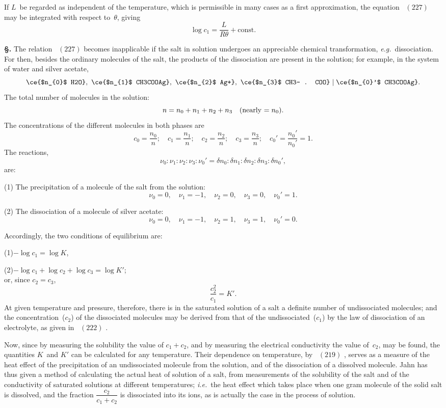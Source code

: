 \documentclass[12pt]{book}[2005/09/16]
\newcommand{\Chg}[2]{#2}
\newcommand{\Add}[1]{\Chg{}{#1}}
\newcommand{\Section}[1]{
  \medskip\par\textbf{§\;#1}
  \label{section:#1}
}
\newcommand{\Eq}[1]{%
  \hyperref[eqn:#1]{\ensuremath{#1}}%
}
\newcommand{\PageSep}[1]{\ignorespaces}
\newcommand{\const}{\text{const.}}
\newcommand{\eg}{\emph{e.g.}}
\newcommand{\ie}{\emph{i.e.}}
\begin{document}
If $L$~be regarded as independent of the temperature,
which is permissible in many cases as a first approximation,
the equation~\Eq{(227)} may be integrated with respect to~$\theta$,
giving
\[
\log c_{1} = \frac{L}{R\theta} + \const
\]

\Section{267.} The relation~\Eq{(227)} becomes inapplicable if the
salt in solution undergoes an appreciable chemical transformation,
\eg\ dissociation. For then, besides the ordinary
\PageSep{244}
molecules of the salt, the products of the dissociation are
present in the solution; for example, in the system of
water and silver acetate,
%
%
%
\[
\ce{$n_{0}$ H2O},\
\ce{$n_{1}$ CH3COOAg},\
\ce{$n_{2}$ Ag+},\
\ce{$n_{3}$ CH3- . COO} \mid
\ce{$n_{0}'$ CH3COOAg}.
\]
The total number of molecules in the solution:
\[
n = n_{0} + n_{1} + n_{2} + n_{3}\quad\text{(nearly $ = n_{0}$).}
\]
The concentrations of the different molecules in both phases
are
\[
c_{0} = \frac{n_{0}}{n};\quad
c_{1} = \frac{n_{1}}{n};\quad
c_{2} = \frac{n_{2}}{n};\quad
c_{3} = \frac{n_{3}}{n};\quad
c_{0}' = \frac{n_{0}'}{n_{0}'} = 1.
\]
The reactions,
\[
\nu_{0} : \nu_{1} : \nu_{2} : \nu_{3} : \nu_{0}' = \delta n_{0} : \delta n_{1} : \delta n_{2} : \delta n_{3} : \delta n_{0}',
\]
are:

(1) The precipitation of a molecule of the salt from the
solution:
\[
\nu_{0} = 0,\quad
\nu_{1} = -1,\quad
\nu_{2} = 0,\quad
\nu_{3} = 0,\quad
\nu_{0}' = 1.
\]

(2) The dissociation of a molecule of silver acetate:
\[
\nu_{0} = 0,\quad
\nu_{1} = -1,\quad
\nu_{2} = 1,\quad
\nu_{3} = 1,\quad
\nu_{0}' = 0.
\]

Accordingly, the two conditions of equilibrium are:

(1)\qquad $-\log c_{1} = \log K$\Add{,}

(2)\qquad $-\log c_{1} + \log c_{2} + \log c_{3} = \log K'$; \\
or, since $c_{2} = c_{3}$,
\[
\frac{c_{2}^{2}}{c_{1}} = K'.
\]
At given temperature and pressure, therefore, there is in
the saturated solution of a salt a definite number of undissociated
molecules; and the concentration~($c_{2}$) of the
dissociated molecules may be derived from that of the
\PageSep{245}
undissociated~($c_{1}$) by the law of dissociation of an electrolyte,
as given in~\Eq{(222)}.

Now, since by measuring the solubility the value of
$c_{1} + c_{2}$, and by measuring the electrical conductivity the
value of~$c_{2}$, may be found, the quantities $K$~and $K'$ can be
calculated for any temperature. Their dependence on temperature,
by~\Eq{(219)}, serves as a measure of the heat effect of the
precipitation of an undissociated molecule from the solution,
and of the dissociation of a dissolved molecule. Jahn has thus
\index{Jahn}%
given a method of calculating the actual heat of solution of
a salt, from measurements of the solubility of the salt and
of the conductivity of saturated solutions at different temperatures;
\ie\ the heat effect which takes place when one
gram molecule of the solid salt is dissolved, and the fraction
$\dfrac{c_{2}}{c_{1} + c_{2}}$ is dissociated into its ions, as is actually the case in
the process of solution.
\end{document}
